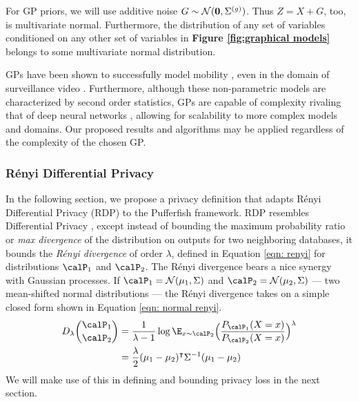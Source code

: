 For GP priors, we will use additive noise $G \sim \mathcal{N}(\mathbf{0}, \Sigma^{(g)})$. Thus $Z = X + G$, too, is multivariate normal. Furthermore, the distribution of any set of variables conditioned on any other set of variables in \textbf{Figure \ref{fig:graphical models}} belongs to some multivariate normal distribution.

GPs have been shown to successfully model mobility \citep{Traffic_GP, PCS_GP, ATM_GP}, even in the domain of surveillance video \citep{surveillance_GP}.  Furthermore, although these non-parametric models are characterized by second order statistics, GPs are capable of complexity rivaling that of deep neural networks \citep{Deep_NN_GP}, allowing for scalability to more complex models and domains. Our proposed results and algorithms may be applied regardless of the complexity of the chosen GP. 


\subsubsection{R\'enyi Differential Privacy}
\label{sec:renyi_dp}
In the following section, we propose a privacy definition that adapts R\'enyi Differential Privacy (RDP) \citep{renyi} to the Pufferfish framework. RDP resembles Differential Privacy \citep{DP}, except instead of bounding the maximum probability ratio or \emph{max divergence} of the distribution on outputs for two neighboring databases, it bounds the \emph{R\'enyi divergence} of order $\lambda$, defined in Equation \eqref{eqn: renyi} for distributions $\calP_1$ and $\calP_2$. The R\'enyi divergence bears a nice synergy with Gaussian processes. If $\calP_1 = \calN(\mu_1, \Sigma)$ and $\calP_2 = \calN(\mu_2, \Sigma)$ --- two mean-shifted normal distributions --- the R\'enyi divergence takes on a simple closed form shown in Equation \eqref{eqn: normal renyi}. 
\begin{align}
	\label{eqn: renyi}
	D_\lambda \binom{\calP_1}{\calP_2} 
	&= \frac{1}{\lambda - 1} \log \E_{x \sim \calP_2} \Big( \frac{P_{\calP_1}(X = x)}{P_{\calP_2}(X = x)} \Big)^\lambda \\
	\label{eqn: normal renyi}
	&= \frac{\lambda}{2} (\mu_1 - \mu_2)^\intercal \Sigma^{-1} (\mu_1 - \mu_2)
\end{align}
We will make use of this in defining and bounding privacy loss in the next section. 